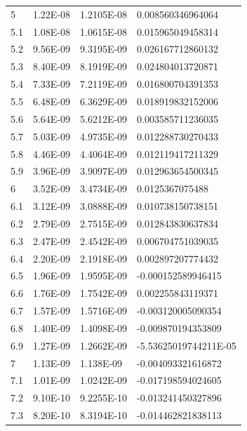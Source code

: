 \documentclass{ctexart}
\begin{document}
\begin{longtable}{l|lll}
5    & 1.22E-08                  & 1.2105E-08 & 0.008560346964064     \\
5.1  & 1.08E-08                  & 1.0615E-08 & 0.015965049458314     \\
5.2  & 9.56E-09                  & 9.3195E-09 & 0.026167712860132     \\
5.3  & 8.40E-09                  & 8.1919E-09 & 0.024804013720871     \\
5.4  & 7.33E-09                  & 7.2119E-09 & 0.016800704391353     \\
5.5  & 6.48E-09                  & 6.3629E-09 & 0.018919832152006     \\
5.6  & 5.64E-09                  & 5.6212E-09 & 0.003585711236035     \\
5.7  & 5.03E-09                  & 4.9735E-09 & 0.012288730270433     \\
5.8  & 4.46E-09                  & 4.4064E-09 & 0.012119417211329     \\
5.9  & 3.96E-09                  & 3.9097E-09 & 0.012963654500345     \\
6    & 3.52E-09                  & 3.4734E-09 & 0.0125367075488       \\
6.1  & 3.12E-09                  & 3.0888E-09 & 0.010738150738151     \\
6.2  & 2.79E-09                  & 2.7515E-09 & 0.012843830637834     \\
6.3  & 2.47E-09                  & 2.4542E-09 & 0.006704751039035     \\
6.4  & 2.20E-09                  & 2.1918E-09 & 0.002897207774432     \\
6.5  & 1.96E-09                  & 1.9595E-09 & -0.000152589946415    \\
6.6  & 1.76E-09                  & 1.7542E-09 & 0.002255843119371     \\
6.7  & 1.57E-09                  & 1.5716E-09 & -0.003120005090354    \\
6.8  & 1.40E-09                  & 1.4098E-09 & -0.009870194353809    \\
6.9  & 1.27E-09                  & 1.2662E-09 & -5.53625019744211E-05 \\
7    & 1.13E-09                  & 1.138E-09  & -0.004093321616872    \\
7.1  & 1.01E-09                  & 1.0242E-09 & -0.017198594024605    \\
7.2  & 9.10E-10                  & 9.2255E-10 & -0.013241450327896    \\
7.3  & 8.20E-10                  & 8.3194E-10 & -0.014462821838113    \\

\end{longtable}
\end{document}
